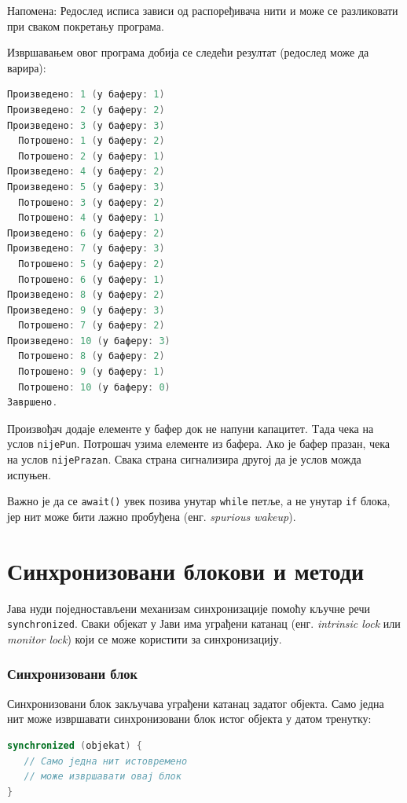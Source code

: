 Напомена: Редослед исписа зависи од распоређивача нити и може се разликовати при сваком покретању програма.

Извршавањем овог програма добија се следећи резултат (редослед може да варира):


\begin{lstlisting}[language=Java]
Произведено: 1 (у баферу: 1)
Произведено: 2 (у баферу: 2)
Произведено: 3 (у баферу: 3)
  Потрошено: 1 (у баферу: 2)
  Потрошено: 2 (у баферу: 1)
Произведено: 4 (у баферу: 2)
Произведено: 5 (у баферу: 3)
  Потрошено: 3 (у баферу: 2)
  Потрошено: 4 (у баферу: 1)
Произведено: 6 (у баферу: 2)
Произведено: 7 (у баферу: 3)
  Потрошено: 5 (у баферу: 2)
  Потрошено: 6 (у баферу: 1)
Произведено: 8 (у баферу: 2)
Произведено: 9 (у баферу: 3)
  Потрошено: 7 (у баферу: 2)
Произведено: 10 (у баферу: 3)
  Потрошено: 8 (у баферу: 2)
  Потрошено: 9 (у баферу: 1)
  Потрошено: 10 (у баферу: 0)
Завршено.
\end{lstlisting}


Произвођач додаје елементе у бафер док не напуни капацитет. Tада чека на услов \texttt{nijePun}. Потрошач узима елементе из бафера.  Aко је бафер празан, чека на услов \texttt{nijePrazan}. Свака страна сигнализира другој да је услов можда испуњен.

Важно је да се \texttt{await()} увек позива унутар \texttt{while} петље, а не унутар \texttt{if} блока, јер нит може бити лажно пробуђена (енг. \textit{spurious wakeup}).


\section{Синхронизовани блокови и методи}

Јава нуди поједностављени механизам синхронизације помоћу кључне речи \texttt{synchronized}. Сваки објекат у Јави има уграђени катанац (енг. \textit{intrinsic lock} или \textit{monitor lock}) који се може користити за синхронизацију.


\subsubsection{Синхронизовани блок}

Синхронизовани блок закључава уграђени катанац задатог објекта. Само једна нит може извршавати синхронизовани блок истог објекта у датом тренутку:


\begin{lstlisting}[language=Java]
synchronized (objekat) {
   // Само једна нит истовремено
   // може извршавати овај блок
}
\end{lstlisting}


